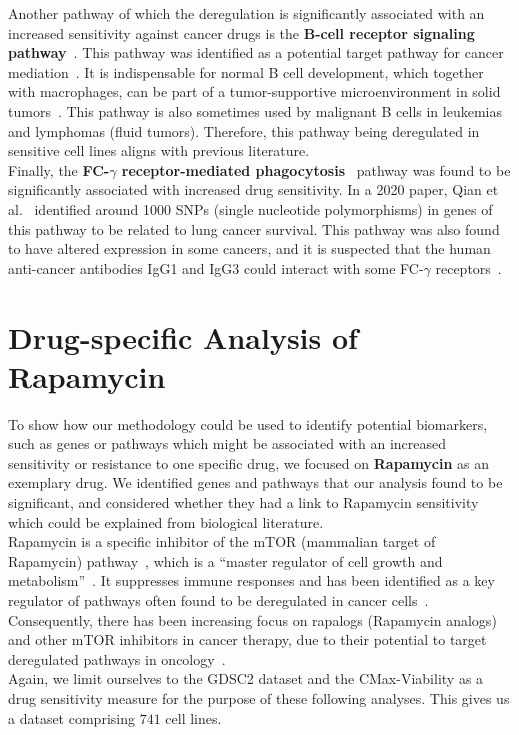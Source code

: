 Another pathway of which the deregulation is significantly associated with an increased sensitivity against cancer drugs is the \textbf{B-cell receptor signaling pathway}~\cite{kegg_b_cell_receptor_signaling_pathway}. This pathway was identified as a potential target pathway for cancer mediation~\cite{b_cell_receptor_signaling_pathway}. It is indispensable for normal B cell development, which together with macrophages, can be part of a tumor-supportive microenvironment in solid tumors~\cite{b_cell_receptor_signaling_pathway}. This pathway is also sometimes used by malignant B cells in leukemias and lymphomas (fluid tumors). Therefore, this pathway being deregulated in sensitive cell lines aligns with previous literature.\\
Finally, the \textbf{FC-$\gamma$ receptor-mediated phagocytosis}~\cite{kegg_fc_gamma} pathway was found to be significantly associated with increased drug sensitivity. In a 2020 paper, Qian et al.~\cite{fc_gamma} identified around 1000 SNPs (single nucleotide polymorphisms) in genes of this pathway to be related to lung cancer survival. This pathway was also found to have altered expression in some cancers, and it is suspected that the human anti-cancer antibodies IgG1 and IgG3 could interact with some FC-$\gamma$ receptors~\cite{fc_gamma_cancer}.

\section{Drug-specific Analysis of Rapamycin}\label{sec:rapamycin_analysis}
To show how our methodology could be used to identify potential biomarkers, such as genes or pathways which might be associated with an increased sensitivity or resistance to one specific drug, we focused on \textbf{Rapamycin} as an exemplary drug. We identified genes and pathways that our analysis found to be significant, and considered whether they had a link to Rapamycin sensitivity which could be explained from biological literature.\\
Rapamycin is a specific inhibitor of the mTOR (mammalian target of Rapamycin) pathway~\cite{kegg_mtor}, which is a ``master regulator of cell growth and metabolism''~\cite{rapamycin_one_drug_many_effects}. It suppresses immune responses and has been identified as a key regulator of pathways often found to be deregulated in cancer cells~\cite{mtor_cancer}. Consequently, there has been increasing focus on rapalogs (Rapamycin analogs) and other mTOR inhibitors in cancer therapy, due to their potential to target deregulated pathways in oncology~\cite{towards_rapalog_cancer_therapy}.\\
Again, we limit ourselves to the GDSC2 dataset and the CMax-Viability as a drug sensitivity measure for the purpose of these following analyses. This gives us a dataset comprising $741$ cell lines.

